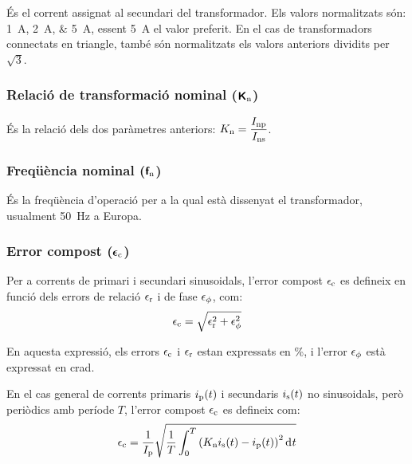  És el corrent assignat al
secundari del transformador. Els valors normalitzats
són: \qtylist{1;2;5}{A}, essent \qty{5}{A} el valor preferit. En el cas de transformadors connectats en triangle, també són normalitzats els valors anteriors dividits per $ \sqrt{3}$.

\subsubsection{Relació de transformació nominal (${\boldsymbol{\mathsf{K_\text{n}}}}$)}

És la relació dels dos  paràmetres anteriors: $K_\mathrm{n} = \dfrac{I_\mathrm{np}}{I_\mathrm{ns}}$.

\subsubsection{Freqüència nominal (${\boldsymbol{\mathsf{f_\text{n}}}}$)}

 És la freqüència d'operació per a la qual    està dissenyat el transformador, usualment \qty{50}{Hz} a Europa.

\subsubsection{Error compost (${\boldsymbol{\mathsf{\epsilon_\text{c}}}}$)}

Per a corrents de primari i secundari sinusoidals, l'error compost $\epsilon_\mathrm{c}$ es defineix  en funció dels errors de relació $\epsilon_\mathrm{r}$ i de fase  $\epsilon_\mathrm{\phi}$, com:
\begin{equation}
    \epsilon_\mathrm{c} = \sqrt{\epsilon_\mathrm{r}^2 +  \epsilon_\mathrm{\phi}^2}
\end{equation}

En aquesta expressió, els errors $\epsilon_\mathrm{c}$ i $\epsilon_\mathrm{r}$  estan expressats en \si{\percent}, i l'error $\epsilon_\mathrm{\phi}$ està expressat en crad.

En el cas general de corrents primaris $i_\mathrm{p}(t)$ i secundaris $i_\mathrm{s}(t)$ no sinusoidals, però periòdics amb període $T$, l'error compost $\epsilon_\mathrm{c}$ es defineix com:
\begin{equation}
    \epsilon\ped{c} = \frac{1}{I\ped{p}} \sqrt{\frac{1}{T} \int_0^T \left(K\ped{n} i\ped{s}(t) - i\ped{p}(t)\right)^2 \diff t}
\end{equation}

